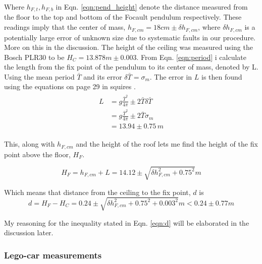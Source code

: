 \documentclass[11pt,a4paper]{article}
\begin{document}
    Where $h_{F, t}, h_{F, b}$ in Eqn. \ref{eqn:pend_height} denote the distance measured from the floor to the top and bottom of the Focault pendulum respectively. These readings imply that the center of mass, $h_{F, cm} = 18cm \pm \delta h_{F, cm}$, where $\delta h_{F, cm}$ is a potentially large error of unknown size due to systematic faults in our procedure. More on this in the discussion.
    \newline
    \newline
    The height of the ceiling was measured using the Bosch PLR30 to be $H_C = 13.878m \pm 0.003$.
    \newline
    \newline
    From Eqn. \ref{eqn:period} i calculate the length from the fix point of the pendulum to its center of mass, denoted by L. Using the mean period $\bar T$ and its error $\delta \bar T = \sigma_m$. The error in $L$ is then found using the equations on page 29 in squires \cite{squires}.
    \begin{align}
      \begin{split}
      L &= g\frac{\bar T^2}{4\pi} \pm 2\bar T\delta \bar T\\ &= g\frac{\bar T^2}{4\pi} \pm 2\bar T\sigma_m \\&=13.94 \pm 0.75\,m
      \end{split}
    \end{align}

    This, along with $h_{F, cm}$ and the height of the roof lets me find the height of the fix point above the floor, $H_F$.

    \begin{equation}
      H_F = h_{F, cm} + L = 14.12 \pm \sqrt{\delta h_{F, cm}^2 + 0.75^2}m
    \end{equation}

    Which means that distance from the ceiling to the fix point, $d$ is 
    \begin{equation}
      d = H_F - H_C = 0.24 \pm \sqrt{\delta h_{F, cm}^2 + 0.75^2 + 0.003^2}m < 0.24 \pm 0.77m
      \label{eqn:d}
    \end{equation}

    My reasoning for the inequality stated in Eqn. \ref{eqn:d} will be elaborated in the discussion later.

  \subsubsection{Lego-car measurements}
\end{document}

